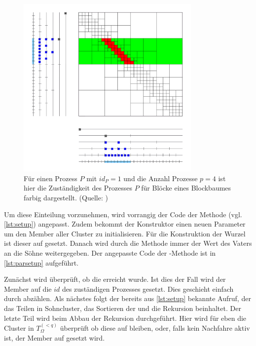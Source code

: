     \begin{figure}[t]
      \includegraphics[width=0.8\textwidth]{img/verteilter_blockbaum.png}
      \caption{Für einen Prozess $P$ mit $id_P = 1$ und die Anzahl Prozesse $p = 4$ ist hier die Zuständigkeit des Prozesses $P$ für Blöcke eines Blockbaumes farbig dargestellt.
	       (Quelle: \citet{h2slides})}
      \label{fig:vertblock}
    \end{figure}
    
    Um diese Einteilung vorzunehmen, wird vorrangig der Code der Methode  (vgl. \autoref{lst:setup}) angepasst. 
    Zudem bekommt der Konstruktor  einen neuen Parameter um den Member  aller Cluster zu initialisieren. Für die Konstruktion der Wurzel ist dieser auf
     gesetzt. Danach wird durch die Methode  immer der Wert des Vaters an die Söhne weitergegeben.
    Der angepasste Code der -Methode ist in \autoref{lst:parsetup} aufgeführt.
    
    Zunächst wird überprüft, ob die  erreicht wurde. Ist dies der Fall wird der Member  auf 
    die $id$ des zuständigen Prozesses gesetzt. Dies geschieht einfach durch abzählen. Als nächstes folgt der bereits aus \autoref{lst:setup} bekannte Aufruf, der das Teilen in Sohncluster, das 
    Sortieren der  und die Rekursion beinhaltet. Der letzte Teil wird beim Abbau der Rekursion durchgeführt. Hier wird für eben die Cluster in $T_\Omega^{(<q)}$ überprüft ob diese 
    auf  bleiben, oder, falls kein Nachfahre aktiv ist, der Member  auf  gesetzt wird.
    
